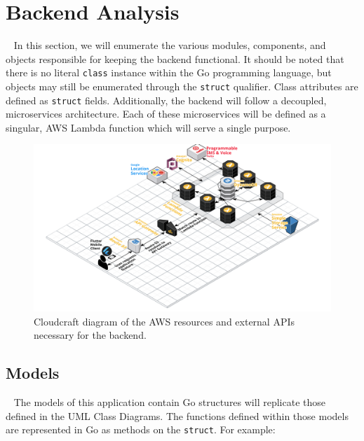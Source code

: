 \documentclass[10pt, a4paper]{article}
\begin{document}
\section{Backend Analysis}
\par ~ In this section, we will enumerate the various modules, components, and objects responsible for keeping the backend functional. It should be noted that there is no literal \texttt{class} instance within the Go programming language, but objects may still be enumerated through the \texttt{struct} qualifier. Class attributes are defined as \texttt{struct} fields. Additionally, the backend will follow a decoupled, microservices architecture. Each of these microservices will be defined as a singular, AWS Lambda function which will serve a single purpose.

\begin{figure}[H]
\begin{center}
\centerline{
	\includegraphics[scale=.10]{EmergenSeek-Backend.PNG}
}
\caption{Cloudcraft \cite{one} diagram of the AWS resources and external APIs necessary for the backend.}
\label{fig:1}
\end{center}	
\end{figure}

\subsection{Models}
\par ~ The models of this application contain Go structures will replicate those defined in the UML Class Diagrams. The functions defined within those models are represented in Go as methods on the \texttt{struct}. For example:
\end{document}

